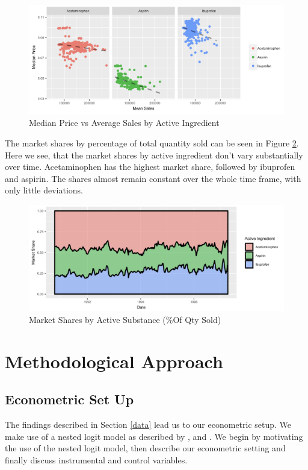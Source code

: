 \documentclass[12pt, authoryear]{elsarticle}
\begin{document}
\begin{figure}[H]
	\centering
	\includegraphics[clip, angle=0, width=1\textwidth]{active_sub_scatter.jpg}
	\caption{ Median Price vs Average Sales by Active Ingredient }\label{new}
\end{figure}

The market shares by percentage of total quantity sold can be seen in Figure \ref{new2}. Here we see, that the market shares by active ingredient don't vary substantially over time. Acetaminophen has the highest market share, followed by ibuprofen and aspirin. The shares almost remain constant over the whole time frame, with only little deviations.

\begin{figure}[H]
	\centering
	\includegraphics[clip, angle=0, width=1\textwidth]{market_share.jpg}
	\caption{ Market Shares by Active Substance (\%Of Qty Sold)}\label{new2}
\end{figure}

\section{Methodological Approach} \label{method}
\subsection{Econometric Set Up} 

The findings described in Section \ref{data} lead us to our econometric setup. We make use of a nested logit model as described by \cite{mcfadden1978modeling}, \cite{cardell1997variance} and \cite{berry1994estimating}. We begin by motivating the use of the nested logit model, then describe our econometric setting and finally discuss instrumental and control variables.
\end{document}
